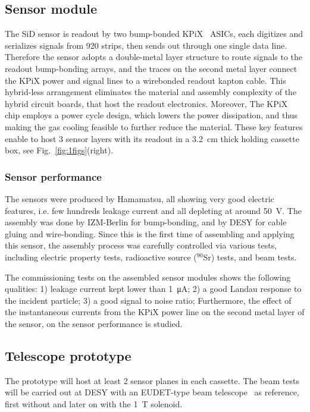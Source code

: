 \subsection*{Sensor module}
The SiD sensor is readout by two bump-bonded KPiX~\cite{kpix} ASICs,
each digitizes and serializes signals from 920 strips, then sends out through one single data line.
Therefore the sensor adopts a double-metal layer structure to route signals to the readout bump-bonding arrays,
and the traces on the second metal layer connect the KPiX power and signal lines to a wirebonded readout kapton cable.
This hybrid-less arrangement eliminates the material and assembly complexity of the hybrid circuit boards, that host the readout electronics.
Moreover, The KPiX chip employs a power cycle design, which lowers the power dissipation,
and thus making the gas cooling feasible to further reduce the material.
These key features enable \lycoris to host 3 sensor layers with its readout in a \SI{3.2}{\centi\metre} thick holding cassette box, see Fig.~\ref{fig:1figs}(right).

\subsubsection*{Sensor performance}
The sensors were produced by Hamamatsu, all showing very good electric features, i.e. few hundreds leakage current and all depleting at around \SI{50}{\volt}.
The assembly was done by IZM-Berlin for bump-bonding, and by DESY for cable gluing and wire-bonding.
Since this is the first time of assembling and applying this sensor,
the assembly process was carefully controlled via various tests,
including electric property tests, radioactive source ($^{90}$Sr) tests, and beam tests.

The commissioning tests on the assembled sensor modules shows the following qualities:
1) leakage current kept lower than \SI{1}{\micro\ampere};
2) a good Landau response to the incident particle;
3) a good signal to noise ratio;
Furthermore, the effect of the instantaneous currents from the KPiX power line on the second metal layer of the sensor,
on the sensor performance is studied.

\subsection*{Telescope prototype}
The prototype will host at least 2 sensor planes in each cassette.
The beam tests will be carried out at DESY with an EUDET-type beam telescope~\cite{eudet} as reference,
first without and later on with the \SI{1}{\tesla} solenoid.

